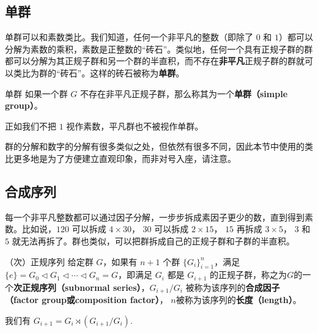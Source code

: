 

\subsection{单群}

单群可以和素数类比。我们知道，任何一个非平凡的整数（即除了 $0$ 和 $1$）都可以分解为素数的乘积，素数是正整数的“砖石”。类似地，任何一个具有正规子群的群都可以分解为其正规子群和另一个群的半直积，而不存在\textbf{非平凡}正规子群的群就可以类比为群的“砖石”。这样的砖石被称为\textbf{单群}。

\begin{definition}{单群}
如果一个群 $G$ 不存在非平凡正规子群，那么称其为一个\textbf{单群（simple group）}。
\end{definition}

正如我们不把 $1$ 视作素数，平凡群也不被视作单群。 

群的分解和数字的分解有很多类似之处，但依然有很多不同，因此本节中使用的类比更多地是为了方便建立直观印象，而非对号入座，请注意。

\subsection{合成序列}

每一个非平凡整数都可以通过因子分解，一步步拆成素因子更少的数，直到得到素数。比如说，$120$ 可以拆成 $4 \times 30$， $30$ 可以拆成 $2 \times 15$， $15$ 再拆成 $3 \times 5$， $3$ 和 $5$ 就无法再拆了。群也类似，可以把群拆成自己的正规子群和子群的半直积。

\begin{definition}{（次）正规序列}
给定群 $G$，如果有 $n+1$ 个群 $\{G_i\}_{i = 1}^n$，满足 $\{e\} = G_0 \triangleleft G_1 \triangleleft \cdots \triangleleft G_n = G$，即满足 $G_{i}$ 都是 $G_{i+1}$ 的正规子群，称之为$G$的一个\textbf{次正规序列（subnormal series）}，$G_{i+1} / G_{i}$ 被称为该序列的\textbf{合成因子（factor group或composition factor）}， $n$被称为该序列的\textbf{长度（length）}。
\end{definition}

我们有 $G_{i + 1} = G_{i} \rtimes (G_{i+1} / G_{i})$.




